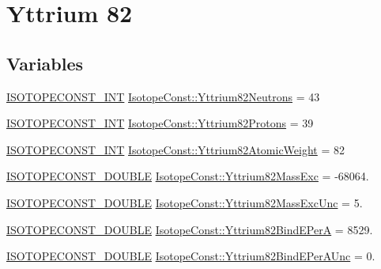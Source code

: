 \hypertarget{group___isotope_const-_yttrium-_y82}{}\section{Yttrium 82}
\label{group___isotope_const-_yttrium-_y82}
\subsection*{Variables}
\begin{DoxyCompactItemize}
\item 
\mbox{\hyperlink{group___isotope_const-_macros_ga5f18360b3e99483a35c32d789e62621c}{I\+S\+O\+T\+O\+P\+E\+C\+O\+N\+S\+T\+\_\+\+I\+NT}} \mbox{\hyperlink{group___isotope_const-_yttrium-_y82_ga85124656b8c322bb9711cf21237ca63f}{Isotope\+Const\+::\+Yttrium82\+Neutrons}} = 43
\item 
\mbox{\hyperlink{group___isotope_const-_macros_ga5f18360b3e99483a35c32d789e62621c}{I\+S\+O\+T\+O\+P\+E\+C\+O\+N\+S\+T\+\_\+\+I\+NT}} \mbox{\hyperlink{group___isotope_const-_yttrium-_y82_ga6665278ca9166470d9f600e52dc2a648}{Isotope\+Const\+::\+Yttrium82\+Protons}} = 39
\item 
\mbox{\hyperlink{group___isotope_const-_macros_ga5f18360b3e99483a35c32d789e62621c}{I\+S\+O\+T\+O\+P\+E\+C\+O\+N\+S\+T\+\_\+\+I\+NT}} \mbox{\hyperlink{group___isotope_const-_yttrium-_y82_gabfe5efdbdbb99a848e43312c7c3e4054}{Isotope\+Const\+::\+Yttrium82\+Atomic\+Weight}} = 82
\item 
\mbox{\hyperlink{group___isotope_const-_macros_ga8f45a7272ce02c0b4c65c44636ed719a}{I\+S\+O\+T\+O\+P\+E\+C\+O\+N\+S\+T\+\_\+\+D\+O\+U\+B\+LE}} \mbox{\hyperlink{group___isotope_const-_yttrium-_y82_gae288bcba9f0102942e3178adc7e8cef5}{Isotope\+Const\+::\+Yttrium82\+Mass\+Exc}} = -\/68064.
\item 
\mbox{\hyperlink{group___isotope_const-_macros_ga8f45a7272ce02c0b4c65c44636ed719a}{I\+S\+O\+T\+O\+P\+E\+C\+O\+N\+S\+T\+\_\+\+D\+O\+U\+B\+LE}} \mbox{\hyperlink{group___isotope_const-_yttrium-_y82_gaa42e73f913b953f6c5b0bfc894df63ee}{Isotope\+Const\+::\+Yttrium82\+Mass\+Exc\+Unc}} = 5.
\item 
\mbox{\hyperlink{group___isotope_const-_macros_ga8f45a7272ce02c0b4c65c44636ed719a}{I\+S\+O\+T\+O\+P\+E\+C\+O\+N\+S\+T\+\_\+\+D\+O\+U\+B\+LE}} \mbox{\hyperlink{group___isotope_const-_yttrium-_y82_ga43b4d953bbe424b5a5a1d73bf55aa0aa}{Isotope\+Const\+::\+Yttrium82\+Bind\+E\+PerA}} = 8529.
\item 
\mbox{\hyperlink{group___isotope_const-_macros_ga8f45a7272ce02c0b4c65c44636ed719a}{I\+S\+O\+T\+O\+P\+E\+C\+O\+N\+S\+T\+\_\+\+D\+O\+U\+B\+LE}} \mbox{\hyperlink{group___isotope_const-_yttrium-_y82_ga147a41c1f0040c097d2888656c686f0b}{Isotope\+Const\+::\+Yttrium82\+Bind\+E\+Per\+A\+Unc}} = 0.

\end{DoxyCompactItemize}
